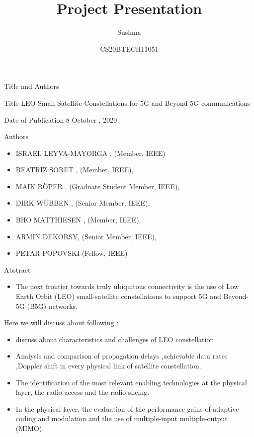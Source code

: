 \documentclass{beamer}
\title{Project Presentation}
\author{Sushma}
\date{CS20BTECH11051}
\begin{document}
\begin{frame}
\titlepage
\end{frame}

\begin{frame}{Title and Authors}
\begin{block}{Title}
LEO Small Satellite Constellations for 5G and Beyond 5G communications
\end{block}
\begin{block}{Date of Publication}
8 October , 2020
\end{block}
\begin{block}{Authors}
\begin{itemize}
    \item ISRAEL LEYVA-MAYORGA , (Member, IEEE)
    \item  BEATRIZ SORET , (Member, IEEE),
    \item  MAIK RÖPER , (Graduate Student Member, IEEE),
    \item DIRK WÜBBEN , (Senior Member, IEEE),
    \item BHO MATTHIESEN , (Member, IEEE),
    \item ARMIN DEKORSY, (Senior Member, IEEE),
    \item  PETAR POPOVSKI  (Fellow, IEEE)
\end{itemize}
\end{block}
\end{frame}

\begin{frame}
 \begin{block}{Abstract}
\begin{itemize}
     \item The next frontier towards truly ubiquitous connectivity is the use of Low Earth Orbit (LEO)
     small-satellite constellations to support 5G and Beyond-5G (B5G) networks.
\end{itemize}     
     Here we will discuss about following :
     \begin{itemize}
    \item discuss about characteristics and challenges of LEO constellation
    \item Analysis and comparison of propagation delays ,achievable data rates ,Doppler shift in every physical link of satellite constellation.
    \item The identification of the most relevant enabling technologies at the physical layer, the radio access and the radio slicing.
    \item In the physical layer, the evaluation of the performance gains of adaptive coding and modulation and the use of multiple-input multiple-output (MIMO).
\end{itemize}
\end{block}   
\end{frame}
\end{document}
